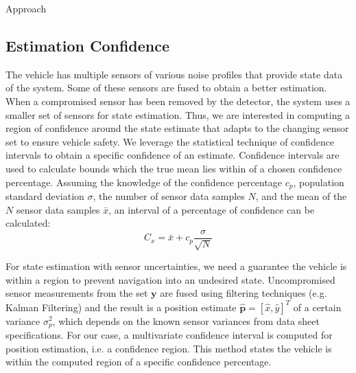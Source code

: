 \begin{section}{Approach}
\subsection{Estimation Confidence}

The vehicle has multiple sensors of various noise profiles that provide state data of the system. Some of these sensors are fused to obtain a better estimation. When a compromised sensor has been removed by the detector, the system uses a smaller set of sensors for state estimation. Thus, we are interested in computing a region of confidence around the state estimate that adapts to the changing sensor set to ensure vehicle safety. We leverage the statistical technique of confidence intervals \cite{devore2011probability} to obtain a specific confidence of an estimate. Confidence intervals are used to calculate bounds which the true mean lies within of a chosen confidence percentage. Assuming the knowledge of the confidence percentage $c_p$, population standard deviation $\sigma$, the number of sensor data samples $N$, and the mean of the $N$ sensor data samples $\bar{x}$, an interval of a percentage of confidence can be calculated:
    \begin{equation}
     \label{Confidence_interval}
		C_x = \bar{x} + c_p\frac{\sigma}{\sqrt{N}}
	\end{equation}
	
	
For state estimation with sensor uncertainties, we need a guarantee the vehicle is within a region to prevent navigation into an undesired state. Uncompromised sensor measurements from the set $\bm{y}$ are fused using filtering techniques (e.g. Kalman Filtering) and the result is a position estimate $\hat{\bm{p}}=[\hat{x},\hat{y}]^T$ of a certain variance $\sigma_p^2$, which depends on the known sensor variances from data sheet specifications. For our case, a multivariate confidence interval is computed for position estimation, i.e. a confidence region. This method states the vehicle is within the computed region of a specific confidence percentage.



\end{section}
